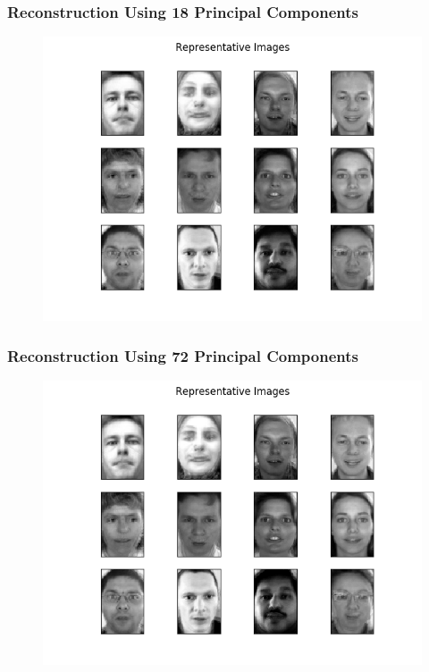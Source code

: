 \documentclass[11pt]{beamer}
\begin{document}
\begin{frame}
\frametitle{Reconstruction Using 18 Principal Components}
\begin{figure}
\includegraphics[width=.95\textwidth]{Representative_Images_U_18.png}
\end{figure}
\end{frame}

\begin{frame}
\frametitle{Reconstruction Using 72 Principal Components}
\begin{figure}
\includegraphics[width=.95\textwidth]{Representative_Images_U_72.png}
\end{figure}
\end{frame}
\end{document}
